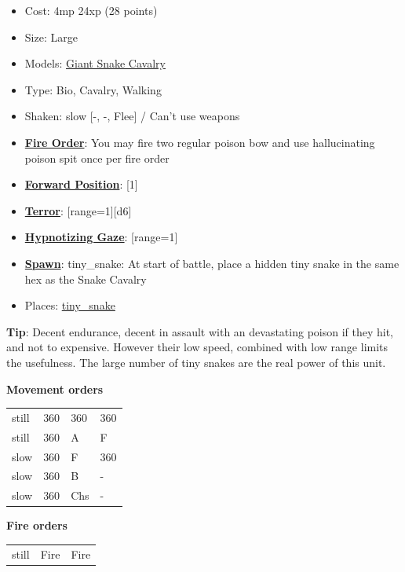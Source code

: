 \documentclass[a4paper,12pt]{article}
\begin{document}
\begin{itemize}
\item Cost: 4mp 24xp (28 points)
\item Size: Large
\item Models: \hyperref[model-giant-snake-cavalry]{Giant Snake Cavalry}
\item Type: Bio, Cavalry, Walking
\item Shaken: slow [-, -, Flee] / Can't use weapons
\item \textbf{\hyperref[rule-special-fire-order]{Fire Order}}: You may fire two regular poison bow and use hallucinating poison spit once per fire order
\item \textbf{\hyperref[rule-special-forward-position]{Forward Position}}: [1]
\item \textbf{\hyperref[rule-special-terror]{Terror}}: [range=1][d6]
\item \textbf{\hyperref[rule-special-hypnotizing-gaze]{Hypnotizing Gaze}}: [range=1]
\item \textbf{\hyperref[rule-special-spawn]{Spawn}}: tiny\_snake: At start of battle, place a hidden tiny snake in the same hex as the Snake Cavalry

\item Places: \hyperref[spawn-tiny-snake]{tiny\_snake}
\end{itemize}
\noindent\textbf{Tip}: Decent endurance, decent in assault with an devastating poison if they hit, and not to expensive. However their low speed, combined with low range limits the usefulness. The large number of tiny snakes are the real power of this unit.

\noindent\textbf{Movement orders}

\begin{tabular}{llll}
still & 360\textdegree{} & 360\textdegree{} & 360\textdegree{} \\
still & 360\textdegree{} & A & F \\
slow & 360\textdegree{} & F & 360\textdegree{} \\
slow & 360\textdegree{} & B & - \\
slow & 360\textdegree{} & Chs & - \\
\end{tabular}
\vspace{1ex}


\noindent\textbf{Fire orders}

\begin{tabular}{lll}
still & Fire & Fire \\
\end{tabular}
\vspace{1ex}
\end{document}
